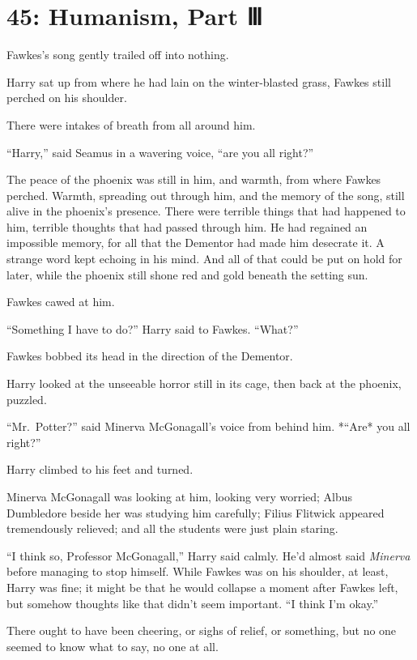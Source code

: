 \chapter{45: Humanism, Part Ⅲ}\label{humanism-part}

Fawkes's song gently trailed off into nothing.

Harry sat up from where he had lain on the winter-blasted grass, Fawkes
still perched on his shoulder.

There were intakes of breath from all around him.

``Harry,'' said Seamus in a wavering voice, ``are you all right?''

The peace of the phoenix was still in him, and warmth, from where Fawkes
perched. Warmth, spreading out through him, and the memory of the song,
still alive in the phoenix's presence. There were terrible things that
had happened to him, terrible thoughts that had passed through him. He
had regained an impossible memory, for all that the Dementor had made
him desecrate it. A strange word kept echoing in his mind. And all of
that could be put on hold for later, while the phoenix still shone red
and gold beneath the setting sun.

Fawkes cawed at him.

``Something I have to do?'' Harry said to Fawkes. ``What?''

Fawkes bobbed its head in the direction of the Dementor.

Harry looked at the unseeable horror still in its cage, then back at the
phoenix, puzzled.

``Mr.~Potter?'' said Minerva McGonagall's voice from behind him. *``Are*
you all right?''

Harry climbed to his feet and turned.

Minerva McGonagall was looking at him, looking very worried; Albus
Dumbledore beside her was studying him carefully; Filius Flitwick
appeared tremendously relieved; and all the students were just plain
staring.

``I think so, Professor McGonagall,'' Harry said calmly. He'd almost
said \emph{Minerva} before managing to stop himself. While Fawkes was on
his shoulder, at least, Harry was fine; it might be that he would
collapse a moment after Fawkes left, but somehow thoughts like that
didn't seem important. ``I think I'm okay.''

There ought to have been cheering, or sighs of relief, or something, but
no one seemed to know what to say, no one at all.

